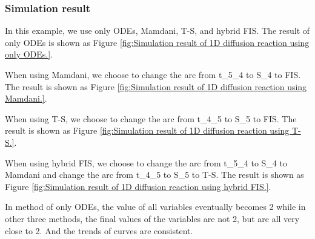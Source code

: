 \documentclass[journal,a4paper,onecolumn]{article}
\begin{document}
\subsubsection{Simulation result}
In this example, we use only ODEs, Mamdani, T-S, and hybrid FIS. The result of only ODEs is shown as Figure \ref{fig:Simulation result of 1D diffusion reaction using only ODEs.}.

When using Mamdani, we choose to change the arc from t\_5\_4 to S\_4 to FIS. The result is shown as Figure \ref{fig:Simulation result of 1D diffusion reaction using Mamdani.}.

When using T-S, we choose to change the arc from t\_4\_5 to S\_5 to FIS. The result is shown as Figure \ref{fig:Simulation result of 1D diffusion reaction using T-S.}.

When using hybrid FIS, we choose to change the arc from t\_5\_4 to S\_4 to Mamdani and change the arc from t\_4\_5 to S\_5 to T-S. 
The result is shown as Figure \ref{fig:Simulation result of 1D diffusion reaction using hybrid FIS.}.

In method of only ODEs, the value of all variables eventually becomes 2 while in other three methods, the final values of the variables are not 2, but are all very close to 2. And the trends of curves are consistent.
\end{document}
